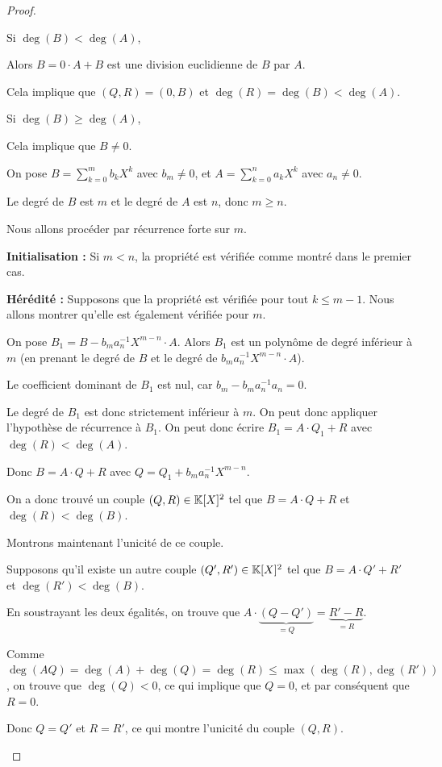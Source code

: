 \documentclass[12pt,a4paper]{report}
\begin{document}
\begin{proof}
    \begin{outline}
        \1 Si $\deg(B) < \deg(A)$,
        
        \2 Alors $B=0\cdot A + B$ est une division euclidienne de $B$ par $A$.

        \2 Cela implique que $(Q,R) = (0,B)$ et $\deg(R) = \deg(B) < \deg(A)$.

        \1 Si $\deg(B) \ge \deg(A)$,

        \2 Cela implique que $B \ne 0$.

        \2 On pose $B = \sum_{k=0}^{m}b_k X^k$ avec $b_m \ne 0$, et $A = \sum_{k=0}^{n}a_k X^k$ avec $a_n \ne 0$.

        \2 Le degré de $B$ est $m$ et le degré de $A$ est $n$, donc $m \ge n$.

        \2 Nous allons procéder par récurrence forte sur $m$.

        \3 \textbf{Initialisation :} Si $m < n$, la propriété est vérifiée comme montré dans le premier cas.

        \3 \textbf{Hérédité :} Supposons que la propriété est vérifiée pour tout $k \le m - 1$. Nous allons montrer qu'elle est également vérifiée pour $m$.

        \3 On pose $B_1 = B - b_m a_n^{-1} X^{m-n} \cdot A$. Alors $B_1$ est un polynôme de degré inférieur à $m$ (en prenant le degré de $B$ et le degré de $b_m a_n^{-1} X^{m-n} \cdot A$).

        \3 Le coefficient dominant de $B_1$ est nul, car $b_m - b_m a_n^{-1} a_n = 0$.

        \3 Le degré de $B_1$ est donc strictement inférieur à $m$. On peut donc appliquer l'hypothèse de récurrence à $B_1$. On peut donc écrire $B_1 = A \cdot Q_1 + R$ avec $\deg(R) < \deg(A)$.

        Donc $B = A \cdot Q + R$ avec $Q = Q_1 + b_m a_n^{-1} X^{m-n}$.

        \3 On a donc trouvé un couple $(Q,R) \in \mathbb{K}[X]^2$ tel que $B = A\cdot Q + R$ et $\deg(R) < \deg(B)$.

        \2 Montrons maintenant l'unicité de ce couple.

        \3 Supposons qu'il existe un autre couple $(Q',R') \in \mathbb{K}[X]^2$ tel que $B = A\cdot Q' + R'$ et $\deg(R') < \deg(B)$.

        \3 En soustrayant les deux égalités, on trouve que $A\cdot \underbrace{(Q-Q')}_{=Q} = \underbrace{R' - R}_{=R}$.

        \3 Comme $\deg(AQ) = \deg(A) + \deg(Q) = \deg(R) \le \max(\deg(R), \deg(R'))$, on trouve que $\deg(Q) < 0$, ce qui implique que $Q = 0$, et par conséquent que $R = 0$.

        \3 Donc $Q = Q'$ et $R = R'$, ce qui montre l'unicité du couple $(Q,R)$.
    \end{outline}
\end{proof}
\end{document}
